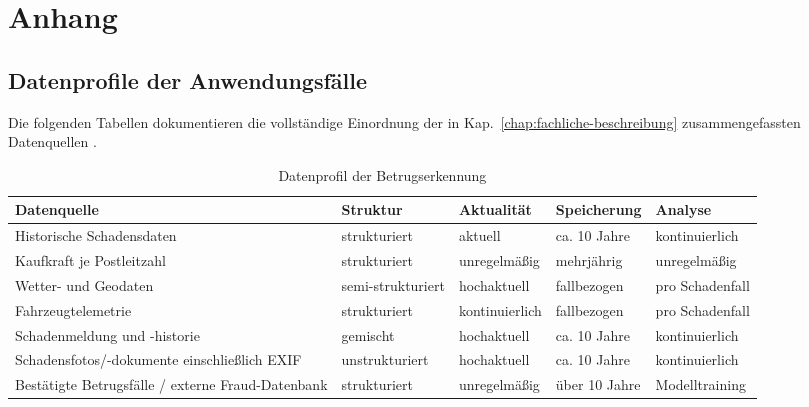 \appendix
\chapter{Anhang}
\label{chap:anhang}

\section{Datenprofile der Anwendungsfälle}
\label{sec:anhang-datenprofile}

Die folgenden Tabellen dokumentieren die vollständige Einordnung der in
Kap.~\ref{chap:fachliche-beschreibung} zusammengefassten Datenquellen
\citep[Folien~11--12, 17--18]{nordakademieSzenarioVersicherung}.

\begin{table}[H]
  \centering
  \footnotesize
  \setlength{\tabcolsep}{3pt}
  \renewcommand{\arraystretch}{0.9}
  \caption{Datenprofil der Betrugserkennung}
  \label{tab:daten-fraud}
  \begin{tabularx}{\textwidth}{@{}
    >{\raggedright\arraybackslash}p{5cm}
    >{\raggedright\arraybackslash}p{2.8cm}
    >{\raggedright\arraybackslash}p{2.0cm}
    >{\raggedright\arraybackslash}p{2.3cm}
    >{\raggedright\arraybackslash}X@{}}
    \toprule
    Datenquelle & Struktur & Aktualität & Speicherung & Analyse \\
    \midrule
    Historische Schadensdaten
      & strukturiert & aktuell & ca. 10 Jahre & kontinuierlich \\
    Kaufkraft je Postleitzahl
      & strukturiert & unregelmäßig & mehrjährig & unregelmäßig \\
    Wetter- und Geodaten
      & semi-strukturiert & hochaktuell & fallbezogen & pro Schadenfall \\
    Fahrzeugtelemetrie
      & strukturiert & kontinuier\-lich & fallbezogen & pro Schadenfall \\
    Schadenmeldung und -historie
      & gemischt & hochaktuell & ca. 10 Jahre & kontinuierlich \\
    Schadensfotos/-dokumente einschließlich EXIF
      & unstruk\-turiert & hochaktuell & ca. 10 Jahre & kontinuierlich \\
    Bestätigte Betrugsfälle / externe Fraud-Datenbank
      & strukturiert & unregelmäßig & über 10 Jahre & Modelltraining \\
    \bottomrule
  \end{tabularx}
\end{table}

